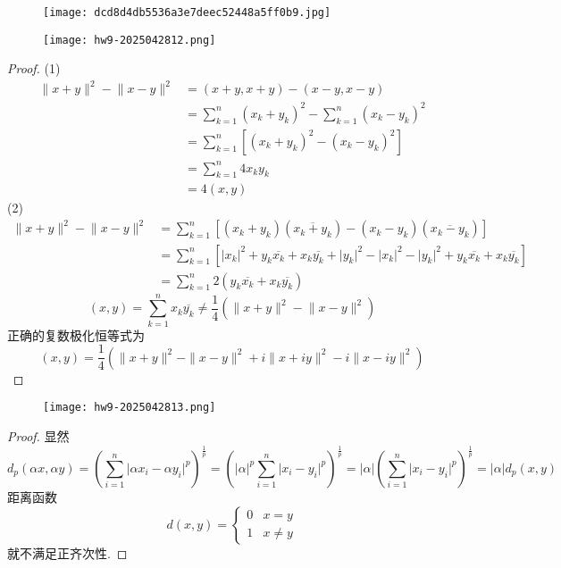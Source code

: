 \begin{figure}[H]
\centering
\texttt{[image: dcd8d4db5536a3e7deec52448a5ff0b9.jpg]}
\label{}
\end{figure}

\begin{exercise}
\begin{figure}[H]
\centering
\texttt{[image: hw9-2025042812.png]}
\label{}
\end{figure}
\end{exercise}
\begin{proof}
(1)
\[
\begin{aligned}
\lVert x+y \rVert ^2-\lVert x-y \rVert ^2 & =(x+y,x+y)-(x-y,x-y) \\
 & =\sum_{k=1}^{n} (x_k+y_k)^2-\sum_{k=1}^{n} (x_k-y_k)^2 \\
 & =\sum_{k=1}^{n} [(x_k+y_k)^2-(x_k-y_k)^2] \\
 & =\sum_{k=1}^{n} 4x_ky_k \\
 & =4(x,y)
\end{aligned}
\]
(2)
\[
\begin{aligned}
\lVert x+y \rVert ^2-\lVert x-y \rVert ^2 & =\sum_{k=1}^{n} [(x_k+y_k)(\overline{x_k+y_k})-(x_k-y_k)(\overline{x_k-y_k})] \\
 & =\sum_{k=1}^{n} [\lvert x_k \rvert ^2+y_k \overline{x_k}+x_k \overline{y_k}+\lvert y_k \rvert ^2-\lvert x_k \rvert ^2-\lvert y_k \rvert ^2+y_k \overline{x_k}+x_k \overline{y_k}] \\
 & =\sum_{k=1}^{n}  2(y_k \overline{x_k}+x_k \overline{y_k})
\end{aligned}
\]
\[
(x,y)=\sum_{k=1}^{n} x_k \overline{y_k}\neq \frac{1}{4}(\lVert x+y \rVert ^2-\lVert x-y \rVert ^2)
\]
正确的复数极化恒等式为
\[
(x, y)=\frac{1}{4}\left(\|x+y\|^2-\|x-y\|^2+i\|x+i y\|^2-i\|x-i y\|^2\right)
\]
\end{proof}

\begin{exercise}
\begin{figure}[H]
\centering
\texttt{[image: hw9-2025042813.png]}
\label{}
\end{figure}
\end{exercise}
\begin{proof}
显然
\[
d_{p}(\alpha x,\alpha y)=\left( \sum_{i=1}^{n}\lvert \alpha x_i-\alpha y_i \rvert ^{p}  \right)^{\frac{1}{p}}=\left( \lvert \alpha \rvert ^{p}\sum_{i=1}^{n} \lvert x_i-y_i \rvert ^{p} \right)^{\frac{1}{p}}=\lvert \alpha \rvert \left( \sum_{i=1}^{n} \lvert x_i-y_i \rvert ^{p} \right)^{\frac{1}{p}}=\lvert \alpha \rvert d_{p}(x,y)
\]
距离函数
\[
d(x,y)=\begin{cases}
0 & x=y \\
1 & x\neq y 
\end{cases}
\]
就不满足正齐次性.
\end{proof}

